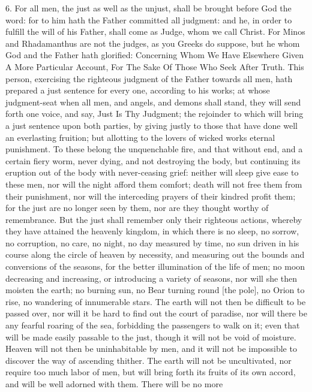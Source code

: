 6. For all men, the just as well as the unjust, shall be brought before
God the word: for to him hath the Father committed all judgment: and he,
in order to fulfill the will of his Father, shall come as Judge, whom we
call Christ. For Minos and Rhadamanthus are not the judges, as you Greeks
do suppose, but he whom God and the Father hath glorified: Concerning Whom
We Have Elsewhere Given A More Particular Account, For The Sake Of Those
Who Seek After Truth. This person, exercising the righteous judgment of
the Father towards all men, hath prepared a just sentence for every one,
according to his works; at whose judgment-seat when all men, and angels,
and demons shall stand, they will send forth one voice, and say, Just Is
Thy Judgment; the rejoinder to which will bring a just sentence upon both
parties, by giving justly to those that have done well an everlasting
fruition; but allotting to the lovers of wicked works eternal punishment.
To these belong the unquenchable fire, and that without end, and a certain
fiery worm, never dying, and not destroying the body, but continuing its
eruption out of the body with never-ceasing grief: neither will sleep give
ease to these men, nor will the night afford them comfort; death will not
free them from their punishment, nor will the interceding prayers of their
kindred profit them; for the just are no longer seen by them, nor are they
thought worthy of remembrance. But the just shall remember only their
righteous actions, whereby they have attained the heavenly kingdom, in
which there is no sleep, no sorrow, no corruption, no care, no night, no
day measured by time, no sun driven in his course along the circle of
heaven by necessity, and measuring out the bounds and conversions of the
seasons, for the better illumination of the life of men; no moon
decreasing and increasing, or introducing a variety of seasons, nor will
she then moisten the earth; no burning sun, no Bear turning round [the
pole], no Orion to rise, no wandering of innumerable stars. The earth will
not then be difficult to be passed over, nor will it be hard to find out
the court of paradise, nor will there be any fearful roaring of the sea,
forbidding the passengers to walk on it; even that will be made easily
passable to the just, though it will not be void of moisture. Heaven will
not then be uninhabitable by men, and it will not be impossible to
discover the way of ascending thither. The earth will not be uncultivated,
nor require too much labor of men, but will bring forth its fruits of its
own accord, and will be well adorned with them. There will be no more
